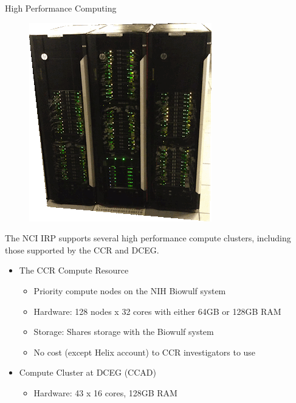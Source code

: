 \documentclass[final]{beamer}
\begin{document}
\begin{frame}[t]
\begin{columns}[t]
    \begin{column}{0.3\linewidth}
      \begin{block}{High Performance Computing}
        \begin{figure}
          \begin{center}
            \includegraphics[width=0.4\linewidth]{20130102-LCP-nodes}
          \end{center}
          \label{fig:biowulf}
        \end{figure}
{\small
The NCI IRP supports several high performance compute clusters, including those supported by the CCR and DCEG.
        \begin{itemize}
          \item{The CCR Compute Resource}
            \begin{itemize}
            \item{Priority compute nodes on the NIH Biowulf system}
            \item{Hardware: 128 nodes x 32 cores with either 64GB or 128GB RAM}
            \item{Storage: Shares storage with the Biowulf system}
            \item{No cost (except Helix account) to CCR investigators to use}
            \end{itemize}
          \item{Compute Cluster at DCEG (CCAD)}
            \begin{itemize}
            \item{Hardware: 43 x 16 cores, 128GB RAM}
            \end{itemize}
        \end{itemize}
}
            

\end{block}
\end{column}
\end{columns}
\end{frame}
\end{document}
